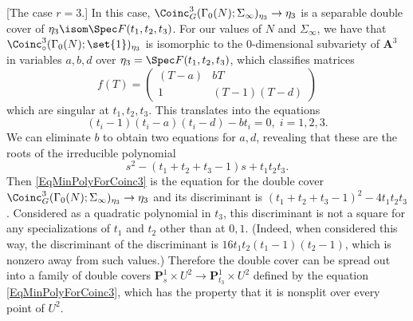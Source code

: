 \documentclass{article}
\def\P{\mathbf{P}}
\begin{document}
\begin{ex}\label{ex:coinc-3}[The case $r=3$.]  In this case, $\Coinc^3_G(\Gamma_0(N);\Sigma_\infty)_{\eta_3}\to\eta_3$ is a separable double cover of $\eta_3\isom \Spec F(t_1,t_2,t_3)$.  For our values of $N$ and $\Sigma_\infty$, we have that $\Coinc^3_{\circ}(\Gamma_0(N);\set{1})_{\eta_3}$ is isomorphic to the 0-dimensional subvariety of $\mathbf{A}^3$ in variables $a,b,d$ over $\eta_3=\Spec F(t_1,t_2,t_3)$, which classifies matrices 
\[ f(T)=\begin{pmatrix}
(T-a) & b T \\
1 & (T-1)(T-d)
\end{pmatrix}
\]
which are singular at $t_1,t_2,t_3$.  This translates into the equations
\[ (t_i-1)(t_i-a)(t_i-d)-b t_i = 0,\;i=1,2,3. \]
We can eliminate $b$ to obtain two equations for $a,d$, revealing that these are the roots of the irreducible polynomial
\begin{equation}
\label{EqMinPolyForCoinc3}
s^2 - (t_1+t_2+t_3-1)s + t_1t_2t_3.
\end{equation}
Then \eqref{EqMinPolyForCoinc3} is the equation for the double cover $\Coinc^3_G(\Gamma_0(N);\Sigma_\infty)_{\eta_3}\to\eta_3$ and its discriminant is
$(t_1+t_2+t_3-1)^2 - 4t_1t_2t_3$.  Considered as a quadratic polynomial in $t_3$, this discriminant is not a square for any specializations of $t_1$ and $t_2$ other than at $0,1$.  (Indeed, when considered this way, the discriminant of the discriminant is $16t_1t_2(t_1-1)(t_2-1)$, which is nonzero away from such values.) 
Therefore the double cover can be spread out into a family of double covers $\P^1_s\times U^2\to \P^1_{t_3} \times U^2$ defined by the equation \eqref{EqMinPolyForCoinc3}, which has the property that it is nonsplit over every point of $U^2$.  
\end{ex}
\end{document}
